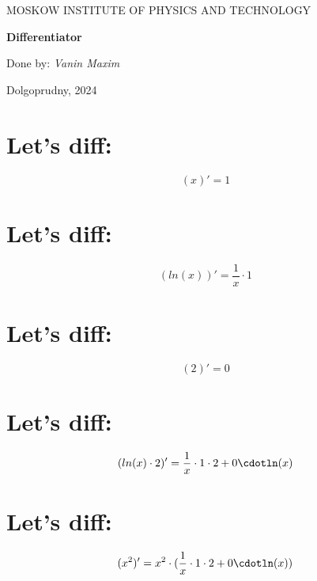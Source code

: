 \documentclass[a4paper,12pt]{article}
\date{}
\begin{document}
\begin{titlepage}
\begin{center}
	\textsc{MOSKOW INSTITUTE OF PHYSICS AND TECHNOLOGY}
	\vspace{2ex}

\end{center}
\vspace{10ex}
\begin{center}
	\vspace{24ex}

	\vspace{2ex}
	\textbf{\Large{Differentiator}}
	\vspace{34ex}
	\begin{flushright}
	\noindent
	Done by:
	\textit{Vanin Maxim}
	\end{flushright}
	\vfill
	Dolgoprudny, 2024
\end{center}
\end{titlepage}
\newpage
\section{Let's diff:}
\begin{center}
	$$( x )' =  1 $$
\end{center}
\section{Let's diff:}
\begin{center}
	$$(ln( x ))' = \frac 1  x \cdot 1 $$
\end{center}
\section{Let's diff:}
\begin{center}
	$$( 2 )' =  0 $$
\end{center}
\section{Let's diff:}
\begin{center}
	$$(ln( x )\cdot 2 )' = \frac 1  x \cdot 1 \cdot 2 + 0 \cdotln( x )$$
\end{center}
\section{Let's diff:}
\begin{center}
	$$( x ^ 2 )' =  x ^ 2 \cdot(\frac 1  x \cdot 1 \cdot 2 + 0 \cdotln( x ))$$
\end{center}
\end{document}
